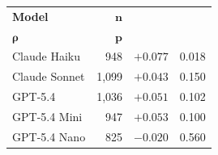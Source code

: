 \begin{tabular}{@{}lrrr@{}}
\toprule
\textbf{Model} & $\boldsymbol{n}$ & \makecell{\textbf{Spearman}\\$\boldsymbol{\rho}$} & $\boldsymbol{p}$ \\
\midrule
Claude Haiku & 948 & $+0.077$ & 0.018 \\
Claude Sonnet & 1,099 & $+0.043$ & 0.150 \\
GPT-5.4 & 1,036 & $+0.051$ & 0.102 \\
GPT-5.4 Mini & 947 & $+0.053$ & 0.100 \\
GPT-5.4 Nano & 825 & $-0.020$ & 0.560 \\
\bottomrule
\end{tabular}